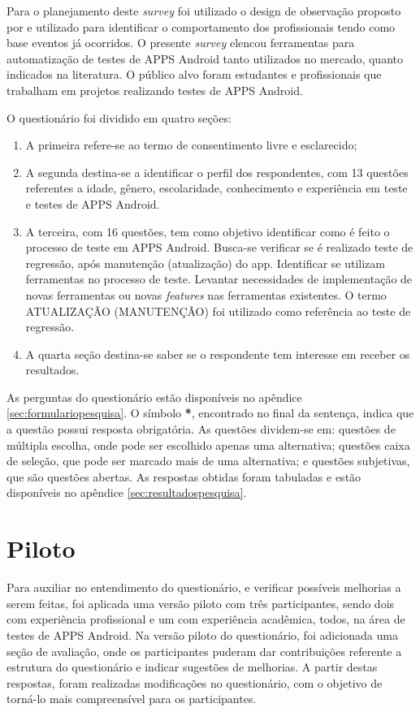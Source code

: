 Para o planejamento deste \textit{survey} foi utilizado o design de observação proposto por \cite{Kitchenham:2002:PSR:566493.566495} e \cite{Kasunic2005DesigningAE} utilizado para identificar o comportamento dos profissionais tendo como base eventos já ocorridos. O presente \textit{survey} elencou ferramentas para automatização de testes de \ac{APPS} Android tanto utilizados no mercado, quanto indicados na literatura. O público alvo foram estudantes e profissionais que trabalham em projetos realizando testes de \ac{APPS} Android. 

O questionário foi dividido em quatro seções:
\begin{enumerate}
    \item A primeira refere-se ao termo de consentimento livre e esclarecido;
    \item A segunda destina-se a identificar o perfil dos respondentes, com 13 questões referentes a idade, gênero, escolaridade, conhecimento e experiência em teste e testes de \ac{APPS} Android.
    \item A terceira, com 16 questões, tem como objetivo identificar como é feito o processo de teste em \ac{APPS} Android. Busca-se verificar se é realizado teste de regressão, após manutenção (atualização) do app. Identificar se utilizam ferramentas no processo de teste. Levantar necessidades de implementação de novas ferramentas ou novas \textit{features} nas ferramentas existentes. O termo ATUALIZAÇÃO (MANUTENÇÃO) foi utilizado como referência ao teste de regressão.
    \item A quarta seção destina-se saber se o respondente tem interesse em receber os resultados.
\end{enumerate}

As perguntas do questionário estão disponíveis no apêndice \ref{sec:formulariopesquisa}. O símbolo \textbf{*}, encontrado no final da sentença, indica que a questão possui resposta obrigatória. As questões dividem-se em: questões de múltipla escolha, onde pode ser escolhido apenas uma alternativa; questões caixa de seleção, que pode ser marcado mais de uma alternativa; e questões subjetivas, que são questões abertas. As respostas obtidas foram tabuladas e estão disponíveis no apêndice \ref{sec:resultadospesquisa}. 

\section{Piloto}

Para auxiliar no entendimento do questionário, e verificar possíveis melhorias a serem feitas, foi aplicada uma versão piloto com três participantes, sendo dois com experiência profissional e um com experiência acadêmica, todos, na área de testes de \ac{APPS} Android. Na versão piloto do questionário, foi adicionada uma seção de avaliação, onde os participantes puderam dar contribuições referente a estrutura do questionário e indicar sugestões de melhorias. A partir destas respostas, foram realizadas modificações no questionário, com o objetivo de torná-lo mais compreensível para os participantes.


